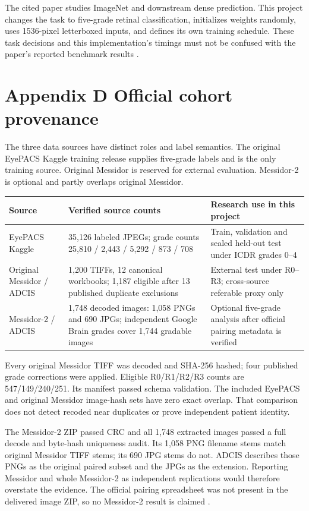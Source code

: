 The cited paper studies ImageNet and downstream dense prediction. This
project changes the task to five-grade retinal classification, initializes
weights randomly, uses 1536-pixel letterboxed inputs, and defines its own
training schedule. These task decisions and this implementation's timings
must not be confused with the paper's reported benchmark results
\cite{vim,mamba}.

\newpage
\section*{\color{ink}Appendix D \quad Official cohort provenance}
The three data sources have distinct roles and label semantics. The
original EyePACS Kaggle training release supplies five-grade labels and
is the only training source. Original Messidor is reserved for external
evaluation. Messidor-2 is optional and partly overlaps original Messidor.

\small
\begin{tabularx}{\linewidth}{@{}p{.22\linewidth}p{.22\linewidth}Y@{}}
\toprule
Source & Verified source counts & Research use in this project\\
\midrule
EyePACS Kaggle & 35,126 labeled JPEGs; grade counts
25,810 / 2,443 / 5,292 / 873 / 708 & Train, validation and sealed held-out
test under ICDR grades 0--4\\
Original Messidor / ADCIS & 1,200 TIFFs, 12 canonical workbooks; 1,187
eligible after 13 published duplicate exclusions & External test under
R0--R3; cross-source referable proxy only\\
Messidor-2 / ADCIS & 1,748 decoded images: 1,058 PNGs and 690 JPGs;
independent Google Brain grades cover 1,744 gradable images & Optional
five-grade analysis after official pairing metadata is verified\\
\bottomrule
\end{tabularx}
\normalsize

Every original Messidor TIFF was decoded and SHA-256 hashed; four
published grade corrections were applied. Eligible R0/R1/R2/R3 counts
are 547/149/240/251. Its manifest passed schema validation. The
included EyePACS and original Messidor image-hash sets have zero exact
overlap. That comparison does not detect recoded near duplicates or
prove independent patient identity.

The Messidor-2 ZIP passed CRC and all 1,748 extracted images passed a
full decode and byte-hash uniqueness audit. Its 1,058 PNG filename stems
match original Messidor TIFF stems; its 690 JPG stems do not. ADCIS
describes those PNGs as the original paired subset and the JPGs as the
extension. Reporting Messidor and whole Messidor-2 as independent
replications would therefore overstate the evidence. The official
pairing spreadsheet was not present in the delivered image ZIP, so no
Messidor-2 result is claimed \cite{messidor,adcis2,grades}.

